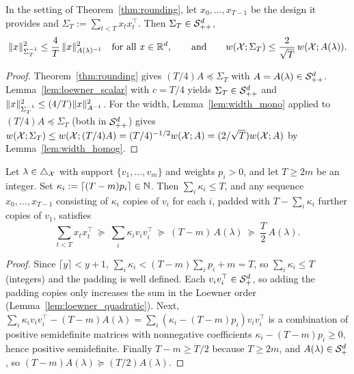 \begin{corollary}\label{cor:fixed_design_from_distribution}
\leanok
{}
In the setting of Theorem~\ref{thm:rounding}, let $x_0,\dots,x_{T-1}$ be the design it provides
and $\Sigma_T := \sum_{t<T}x_tx_t^\top$. Then $\Sigma_T \in \mathcal{S}_{++}^{d}$,
\[
  \lVert x \rVert_{\Sigma_T^{-1}}^2 \le \frac 4T\,\lVert x \rVert_{A(\lambda)^{-1}}^2 \quad\text{for all } x \in \mathbb{R}^d,
  \qquad\text{and}\qquad
  w(\mathcal{X};\Sigma_T) \le \frac{2}{\sqrt T}\,w(\mathcal{X};A(\lambda)) .
\]
\end{corollary}

\begin{proof}
\leanok
{}
Theorem~\ref{thm:rounding} gives $(T/4)A \preceq \Sigma_T$ with $A = A(\lambda) \in \mathcal{S}_{++}^{d}$.
Lemma~\ref{lem:loewner_scalar} with $c = T/4$ yields $\Sigma_T \in \mathcal{S}_{++}^{d}$ and
$\lVert x \rVert_{\Sigma_T^{-1}}^2 \le (4/T)\lVert x \rVert_{A^{-1}}^2$. For the width,
Lemma~\ref{lem:width_mono} applied to $(T/4)A \preceq \Sigma_T$ (both in $\mathcal{S}_{++}^{d}$) gives
$w(\mathcal{X};\Sigma_T) \le w(\mathcal{X};(T/4)A) = (T/4)^{-1/2}w(\mathcal{X};A) =
(2/\sqrt T)w(\mathcal{X};A)$ by Lemma~\ref{lem:width_homog}.
\end{proof}

\begin{lemma}\label{lem:naive_rounding}
Let $\lambda \in \triangle_{\mathcal{X}}$ with support $\{v_1,\dots,v_m\}$ and weights $p_i > 0$, and let
$T \ge 2m$ be an integer. Set $\kappa_i := \lceil (T-m)p_i \rceil \in \mathbb{N}$. Then
$\sum_i\kappa_i \le T$, and any sequence $x_0,\dots,x_{T-1}$ consisting of $\kappa_i$ copies of
$v_i$ for each $i$, padded with $T - \sum_i\kappa_i$ further copies of $v_1$, satisfies
\[
  \sum_{t<T}x_tx_t^\top \ \succeq\ \sum_i\kappa_iv_iv_i^\top \ \succeq\ (T-m)\,A(\lambda) \ \succeq\ \frac T2\,A(\lambda) .
\]
\end{lemma}

\begin{proof}
Since $\lceil y\rceil < y + 1$, $\sum_i\kappa_i < (T-m)\sum_ip_i + m = T$, so $\sum_i\kappa_i \le T$
(integers) and the padding is well defined. Each $v_iv_i^\top \in \mathcal{S}_{+}^{d}$, so adding the padding
copies only increases the sum in the Loewner order (Lemma~\ref{lem:loewner_quadratic}). Next,
$\sum_i\kappa_iv_iv_i^\top - (T-m)A(\lambda) = \sum_i(\kappa_i - (T-m)p_i)v_iv_i^\top$ is a
combination of positive semidefinite matrices with nonnegative coefficients
$\kappa_i - (T-m)p_i \ge 0$, hence positive semidefinite. Finally $T - m \ge T/2$ because
$T \ge 2m$, and $A(\lambda) \in \mathcal{S}_{+}^{d}$, so $(T-m)A(\lambda) \succeq (T/2)A(\lambda)$.
\end{proof}


